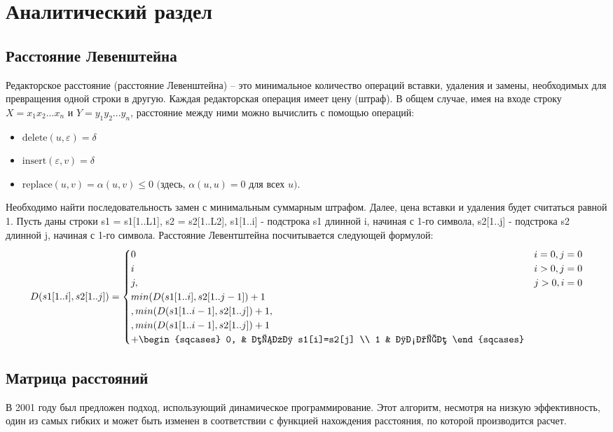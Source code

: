 \chapter{Аналитический раздел}\label{analyth}

\section{Расстояние Левенштейна}\label{defs}

Редакторское расстояние (расстояние Левенштейна) -- это минимальное количество операций вставки, удаления и замены, необходимых для превращения одной строки в другую. Каждая редакторская операция имеет цену (штраф). 
В общем случае, имея на входе строку $X = x_1x_2...x_n$ и $Y = y_1y_2...y_n$, расстояние между ними можно вычислить с помощью операций:
\begin{itemize}
	\item ${\text{delete}(u, \varepsilon) = \delta}$
	\item $\text{insert}(\varepsilon, v) = \delta$
	\item $\text{replace}(u, v) = \alpha(u, v) \leq 0$  $($здесь, $\alpha(u, u) = 0$ для всех $u).$
\end{itemize}

Необходимо найти последовательность замен с минимальным суммарным штрафом. Далее, цена вставки и удаления будет считаться равной 1.
 Пусть даны строки s1 = s1[1..L1], s2 = s2[1..L2], s1[1..i] - подстрока s1 длинной i, начиная с 1-го символа, s2[1..j] - подстрока s2 длинной j, начиная с 1-го символа. Расстояние Левентштейна посчитывается следующей формулой:
\begin{equation}\label{form:lev}
	D(s1[1..i], s2[1..j]) =
	\begin{cases}
		0       & i = 0, j =0\\
		i  & i > 0, j =0 \\
		j, & j > 0, i = 0 \\
		min(D(s1[1..i], s2[1..j-1]) + 1\\, 
		min(D(s1[1..i-1], s2[1..j]) + 1, \\,
		min(D(s1[1..i-1], s2[1..j]) + 1 \\ + 
		\begin{sqcases}
			0, & если s1[i]=s2[j] \\
			1 & иначе
		\end{sqcases}
	\end{cases}
\end{equation}
\section{Матрица расстояний}
В 2001 году был предложен подход, использующий динамическое программирование. Этот алгоритм, несмотря на низкую эффективность, один из самых гибких и может быть изменен в соответствии с функцией нахождения расстояния, по которой производится расчет\cite{Navarro2001}. 

